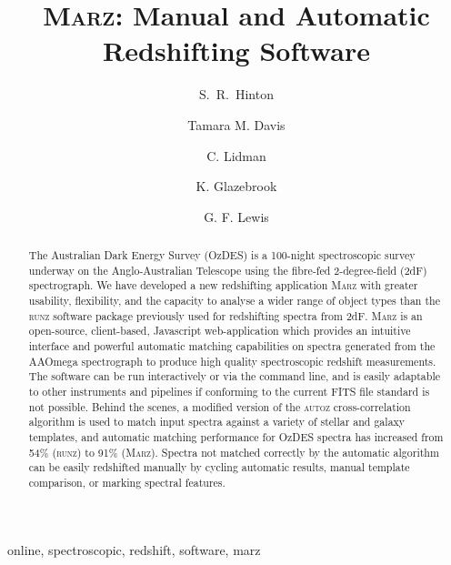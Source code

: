 \documentclass[5p]{elsarticle}
\newcommand{\runz}{\textsc{runz}}
\newcommand{\autoz}{\textsc{autoz}}
\newcommand{\marz}{\textsc{Marz}}
\begin{document}
\begin{frontmatter}

\title{\marz{}: Manual and Automatic Redshifting Software}


\author[affil1,affil2]{S.~R.~Hinton}
\author[affil1]{Tamara M. Davis}
\author[affil3]{C. Lidman}
\author[affil4]{K. Glazebrook}
\author[affil5]{G. F. Lewis}

\address[affil1]{School of Mathematics and Physics, The University of Queensland, QLD 4072, Australia}
\address[affil2]{ARC Centre of Excellence for All-sky Astrophysics (CAASTRO)}
\address[affil3]{Australian Astronomical Observatory, North Ryde, NSW 2113, Australia}
\address[affil4]{Centre for Astrophysics and Supercomputing, Swinburne, University of Technology, Hawthorn, VIC 3122, Australia}
\address[affil5]{Sydney Institute for Astronomy, School of Physics, A28, The University of Sydney, NSW, 2006, Australia}

\begin{abstract}
The Australian Dark Energy Survey (OzDES) is a 100-night spectroscopic survey underway on the Anglo-Australian Telescope using the fibre-fed 2-degree-field (2dF) spectrograph.  We have developed a new redshifting application \marz{} with greater usability, flexibility, and the capacity to analyse a wider range of object types than the \runz{} software package previously used for redshifting spectra from 2dF. \marz{} is an open-source, client-based, Javascript web-application which provides an intuitive interface and powerful automatic matching capabilities on spectra generated from the AAOmega spectrograph to produce high quality spectroscopic redshift measurements. The software can be run interactively or via the command line, and is easily adaptable to other instruments and pipelines if conforming to the current FITS file standard is not possible. Behind the scenes, a modified version of the \autoz{} cross-correlation algorithm is used to match input spectra against a variety of stellar and galaxy templates, and automatic matching performance for OzDES spectra has increased from 54\% (\runz{}) to 91\% (\marz{}). Spectra not matched correctly by the automatic algorithm can be easily redshifted manually by cycling automatic results, manual template comparison, or marking spectral features.
\end{abstract}

\begin{keyword}
online, spectroscopic, redshift, software, marz
\end{keyword}

\end{frontmatter}
\end{document}
